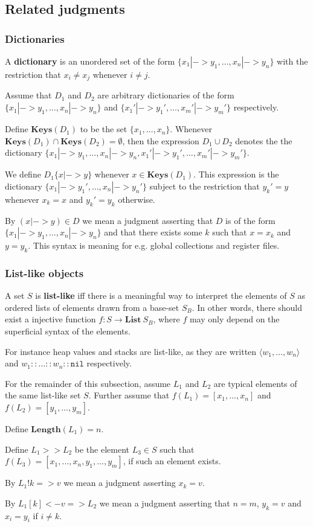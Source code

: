 \subsection{Related judgments}


\subsubsection{Dictionaries}
A \textbf{dictionary} is an unordered set of the form
$\{x_1 |-> y_1, \dots, x_n |-> y_n\}$ with the restriction that $x_i \neq x_j$
whenever $i \neq j$.

Assume that $D_1$ and $D_2$ are arbitrary dictionaries of the form
$\{x_1 |-> y_1, \dots, x_n |-> y_n\}$ and
$\{x_1' |-> y_1', \dots, x_m' |-> y_m'\}$ respectively.

Define $\mathbf{Keys}(D_1)$ to be the set $\{x_1, \dots, x_n\}$. Whenever
$\mathbf{Keys}(D_1) \cap \mathbf{Keys}(D_2) = \emptyset$, then the expression
$D_1 \cup D_2$ denotes the the dictionary
$\{x_1 |-> y_1, \dots, x_n |-> y_n, x_1' |-> y_1', \dots, x_m' |-> y_m'\}$.

We define $D_1\{x |-> y\}$ whenever $x \in \mathbf{Keys}(D_1)$. This expression
is the dictionary $\{x_1 |-> y_1', \dots, x_n |-> y_n'\}$ subject to the
restriction that $y_k' = y$ whenever $x_k = x$ and $y_k' = y_k$ otherwise.

By $(x |-> y) \in D$ we mean a judgment asserting that $D$ is of the form
$\{x_1 |-> y_1, \dots, x_n |-> y_n\}$ and that there exists some $k$ such that
$x = x_k$ and $y = y_k$. This syntax is meaning for e.g. global collections and
register files.

\subsubsection{List-like objects}
A set $S$ is \textbf{list-like} iff there is a meaningful way to interpret the
elements of $S$ as ordered lists of elements drawn from a base-set $S_B$. In
other words, there should exist a injective function
$f : S \to \mathbf{List}\ S_B$, where $f$ may only depend on the superficial
syntax of the elements.

For instance heap values and stacks are list-like, as they are written
$\langle w_1, \dots, w_n \rangle$ and $w_1 :: \dots :: w_n :: \mathtt{nil}$
respectively.

For the remainder of this subsection, assume $L_1$ and $L_2$ are typical
elements of the same list-like set $S$. Further assume that
$f(L_1) = [x_1, \dots, x_n]$ and $f(L_2) = [y_1, \dots, y_m]$.

Define $\mathbf{Length}(L_1) = n$.

Define $L_1 >> L_2$ be the element $L_3 \in S$ such that
$f(L_3) = [x_1, \dots, x_n, y_1, \dots, y_m]$, if such an element exists.

By $L_1 ! k => v$ we mean a judgment asserting $x_k = v$.

By $L_1[k]<- v => L_2$ we mean a judgment asserting that $n=m$, $y_k=v$ and
$x_i = y_i$ if $i \neq k$.
